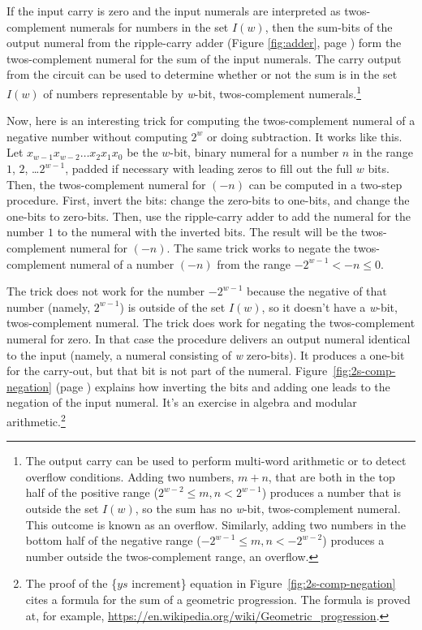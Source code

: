 If the input carry is zero and
the input numerals are interpreted
as twos-complement numerals for numbers in the set $I(w)$,
then the sum-bits of the output numeral from the ripple-carry adder
(Figure \ref{fig:adder}, page \pageref{fig:adder})
form the twos-complement numeral for the sum of the input numerals.
The carry output from the circuit can be used to determine
whether or not the sum is in the set $I(w)$ of numbers representable
by \emph{w}-bit, twos-complement numerals.\footnote{The
output carry can be used to perform multi-word arithmetic
or to detect overflow conditions. Adding two numbers, $m+n$,
that are both in the top half of the positive range
($2^{w-2} \leq m, n < 2^{w-1}$) produces a number that is
outside the set $I(w)$, so the sum has no \emph{w}-bit, twos-complement numeral.
This outcome is known as an overflow.
Similarly, adding two numbers in the bottom half of the
negative range ($-2^{w-1} \leq m,n < -2^{w-2}$)
produces a number outside the twos-complement range, an overflow.}

Now, here is an interesting trick
for computing the twos-complement numeral of a negative number without
computing $2^w$ or doing subtraction.
It works like this.
Let $x_{w-1}x_{w-2} \dots x_2x_1x_0$
be the $w$-bit, binary numeral for a number $n$ in the range $1$, $2$, \dots $2^{w-1}$,
padded if necessary with leading zeros to fill out the full $w$ bits.
Then, the twos-complement numeral for $(-n)$ can be computed
in a two-step procedure.
First, invert the bits: change the zero-bits to one-bits,
and change the one-bits to zero-bits.
Then, use the ripple-carry adder to add the numeral for the number $1$
to the numeral with the inverted bits.
The result will be the twos-complement numeral for $(-n)$.
The same trick works to negate the twos-complement numeral
of a number $(-n)$ from the range $-2^{w-1} < -n \leq 0$.

The trick does not work for the number $-2^{w-1}$
because the negative of that number (namely, $2^{w-1}$)
is outside of the set $I(w)$,
so it doesn't have a \emph{w}-bit, twos-complement numeral.
The trick does work for negating the twos-complement numeral for zero.
In that case the procedure delivers an output numeral identical
to the input (namely, a numeral consisting of \emph{w} zero-bits).
It produces a one-bit for the carry-out, but that bit is not part of the numeral.
Figure~\ref{fig:2s-comp-negation}
(page \pageref{fig:2s-comp-negation})
explains how inverting the bits and adding one leads to the negation
of the input numeral.
It's an exercise in algebra and modular arithmetic.\footnote{The
proof of the \{$ys$ increment\} equation
in Figure~\ref{fig:2s-comp-negation}
cites a formula for the sum of a geometric progression.
The formula is proved at, for example, \url{https://en.wikipedia.org/wiki/Geometric_progression}.}

